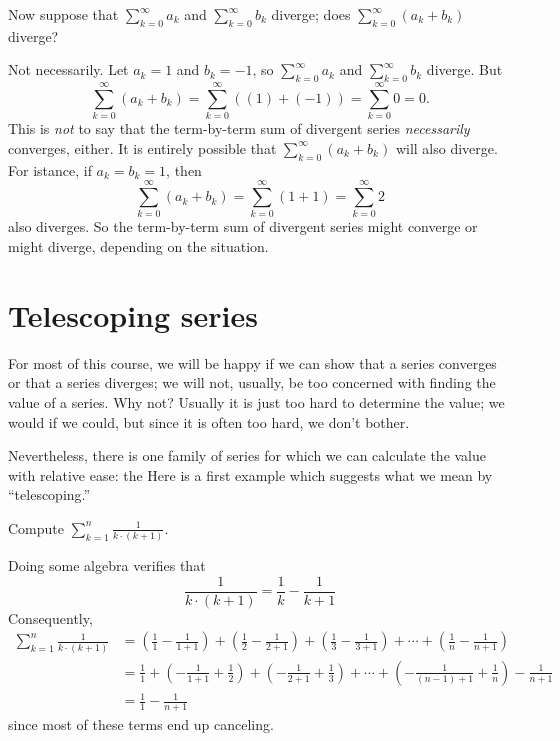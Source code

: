 \begin{example}
Now suppose that $\sum_{k=0}^\infty a_k$ and $\sum_{k=0}^\infty b_k$ diverge; does
$\sum_{k=0}^\infty (a_k+b_k)$ diverge?
\end{example}

\begin{solution}
  Not necessarily.  Let $a_k=1$ and $b_k=-1$, so $\sum_{k=0}^\infty
  a_k$ and $\sum_{k=0}^\infty b_k$ diverge. But
$$\sum_{k=0}^\infty (a_k+b_k)=\sum_{k=0}^\infty \left( \left( 1 \right) + \left( -1 \right) \right)=\sum_{k=0}^\infty 0 = 0.
$$
This is \textit{not} to say that the term-by-term sum of divergent
series \textit{necessarily} converges, either.  It is entirely
possible that $\sum_{k=0}^\infty (a_k+b_k)$ will also diverge.  For
istance, if $a_k=b_k=1$, then 
$$\sum_{k=0}^\infty (a_k+b_k)=\sum_{k=0}^\infty(1+1)=\sum_{k=0}^\infty 2
$$
also diverges.  So the term-by-term sum of divergent series might
converge or might diverge, depending on the situation.
\end{solution}

\section{Telescoping series}
\label{section:telescoping-series}

For most of this course, we will be happy if we can show that a series
converges or that a series diverges; we will not, usually, be too
concerned with finding the value of a series.  Why not?  Usually it is
just too hard to determine the value; we would if we could, but since
it is often too hard, we don't bother.

Nevertheless, there is one family of series for which we can calculate
the value with relative ease: the   Here
is a first example which suggests what we mean by ``telescoping.''

\begin{example}
Compute $\sum_{k=1}^n \frac{1}{k \cdot (k+1)}$.
\end{example}

\begin{solution}
  Doing some algebra verifies that
  $$
  \frac{1}{k \cdot (k+1)} = \frac{1}{k} - \frac{1}{k+1}
  $$
  Consequently,
\begin{align*}
\sum_{k=1}^n \frac{1}{k \cdot (k+1)} &=
\left( \frac{1}{1} - \frac{1}{1+1} \right) + 
\left( \frac{1}{2} - \frac{1}{2+1} \right) + 
\left( \frac{1}{3} - \frac{1}{3+1} \right) + \cdots + 
\left( \frac{1}{n} - \frac{1}{n+1} \right) \\
&=
\frac{1}{1} +
\left( - \frac{1}{1+1} + \frac{1}{2} \right) + 
\left(- \frac{1}{2+1} + \frac{1}{3} \right) + \cdots + 
\left( - \frac{1}{(n-1)+1} + \frac{1}{n} \right) 
- \frac{1}{n+1} \\
&= \frac{1}{1} - \frac{1}{n+1}
\end{align*}
since most of these terms end up canceling.
\end{solution}

